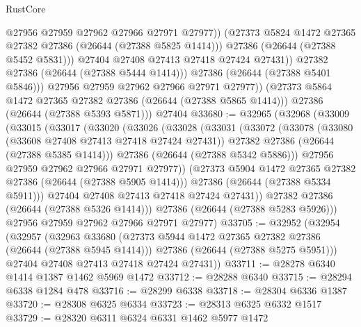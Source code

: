 \begin{lexlean}{RustCore}
\begin{coremodule}
                        @27956
                        @27959
                        @27962
                        @27966
                        @27971
                        @27977))
                    (@27373 @5824 @1472 @27365 @27382 @27386 (@26644 (@27388 @5825 @1414)))
                    @27386
                    (@26644 (@27388 @5452 @5831)))
                  @27404
                  @27408
                  @27413
                  @27418
                  @27424
                  @27431))
              @27382
              @27386
              (@26644 (@27388 @5444 @1414)))
            @27386
            (@26644 (@27388 @5401 @5846)))
          @27956
          @27959
          @27962
          @27966
          @27971
          @27977))
      (@27373 @5864 @1472 @27365 @27382 @27386 (@26644 (@27388 @5865 @1414)))
      @27386
      (@26644 (@27388 @5393 @5871)))
    @27404
@33680 := @32965
    (@32968
      (@33009
        (@33015
          (@33017
            (@33020
              (@33026
                (@33028
                  (@33031
                    (@33072
                      (@33078
                        (@33080 (@33608 @27408 @27413 @27418 @27424 @27431))
                        @27382
                        @27386
                        (@26644 (@27388 @5385 @1414)))
                      @27386
                      (@26644 (@27388 @5342 @5886)))
                    @27956
                    @27959
                    @27962
                    @27966
                    @27971
                    @27977))
                (@27373 @5904 @1472 @27365 @27382 @27386 (@26644 (@27388 @5905 @1414)))
                @27386
                (@26644 (@27388 @5334 @5911)))
              @27404
              @27408
              @27413
              @27418
              @27424
              @27431))
          @27382
          @27386
          (@26644 (@27388 @5326 @1414)))
        @27386
        (@26644 (@27388 @5283 @5926)))
      @27956
      @27959
      @27962
      @27966
      @27971
      @27977)
@33705 := @32952
    (@32954
      (@32957
        (@32963
          @33680
          (@27373 @5944 @1472 @27365 @27382 @27386 (@26644 (@27388 @5945 @1414)))
          @27386
          (@26644 (@27388 @5275 @5951)))
        @27404
        @27408
        @27413
        @27418
        @27424
        @27431))
@33711 := @28278 @6340 @1414 @1387 @1462 @5969 @1472
@33712 := @28288 @6340
@33715 := @28294 @6338 @1284 @478
@33716 := @28299 @6338
@33718 := @28304 @6336 @1387
@33720 := @28308 @6325 @6334
@33723 := @28313 @6325 @6332 @1517
@33729 := @28320 @6311 @6324 @6331 @1462 @5977 @1472

\end{coremodule}
\end{lexlean}
